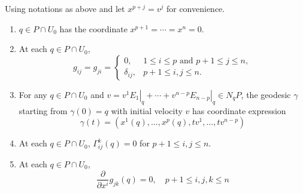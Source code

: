 \begin{enumerate}[label=\arabic{*}.]
 	\begin{prop}
 	    Using notations as above and let $x^{p+j} = v^j$ for convenience.
 	    \begin{enumerate}[label=(\roman*)]
 	    	\item $q \in P \cap U_0$ has the coordinate $x^{p+1} = \cdots = x^n =0$.
 	    	\item At each $q \in P \cap U_0$,
 	    	\begin{equation*}
 	    	    g_{i j}=g_{j i}= \begin{cases}0, & 1 \leq i \leq p \text { and } p+1 \leq j \leq n, \\ \delta_{i j}, & p+1 \leq i, j \leq n .\end{cases}
 	    	\end{equation*}
 	    	\item For any $q \in P \cap U_0$ and $v=\left.v^1 E_1\right|_q+\cdots+\left.v^{n-p} E_{n-p}\right|_q \in N_q P$, the geodesic $\gamma$ starting from $\gamma(0) = q$ with initial velocity $v$ has coordinate expression
 	    	\begin{equation*}
 	    	    \gamma(t)=\left(x^1(q), \ldots, x^p(q), t v^1, \ldots, t v^{n-p}\right)
 	    	\end{equation*}
 	    	\item At each $q \in P \cap U_0$, $\Gamma^k_{ij}(q) = 0$ for $p+1 \leq i,j \leq n$.
 	    	\item At each $q \in P \cap U_0$,
 	    	\begin{equation*}
 	    	    \frac{\partial}{\partial x^i}g_{jk}(q) = 0,\quad p+1 \leq i,j,k \leq n
 	    	\end{equation*} 
 	    \end{enumerate}
 	\end{prop}


\end{enumerate}
